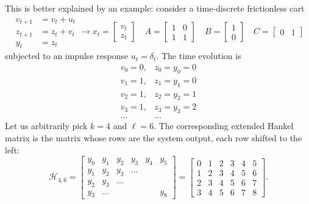 This is better explained by an example: consider a time-discrete frictionless cart
\begin{equation*}
  \begin{aligned}
    v_{t+1} &= v_t + u_t \\
    z_{t+1} &= z_t + v_t \\
    y_t &= z_t
  \end{aligned} \longrightarrow
  x_t =
  \begin{bmatrix}
    v_t \\ z_t
  \end{bmatrix}\quad A =
    \begin{bmatrix}
      1 & 0 \\ 1 & 1
    \end{bmatrix}\quad B =
    \begin{bmatrix}
      1 \\ 0
    \end{bmatrix}\quad C =
    \begin{bmatrix}
      0 & 1
    \end{bmatrix}
\end{equation*}
subjected to an impulse response $u_t=\delta_t$. The time evolution is
\begin{equation*}
  \begin{matrix}
    v_0 = 0, & z_0 = y_0 = 0 \\
    v_1 = 1, & z_1 = y_1 = 0 \\
    v_2 = 1, & z_2 = y_2 = 1 \\
    v_3 = 1, & z_3 = y_3 = 2 \\
    \ldots & \ldots
  \end{matrix}
\end{equation*}
Let us arbitrarily pick $k=4$ and $\ell=6$. The corresponding extended Hankel matrix is the matrix whose rows are the system output, each row shifted to the left:
\begin{equation*}
  \mathcal{H}_{4,6} =
  \begin{bmatrix}
    y_0 & y_1 & y_2 & y_3 & y_4 & y_5 \\
    y_1 & y_2 & y_3 & \ldots & & \\
    y_2 & y_3 & \ldots & & & \\
    y_3 & \ldots & & & & y_8
  \end{bmatrix} =
  \begin{bmatrix}
    0 & 1 & 2 & 3 & 4 & 5 \\
    1 & 2 & 3 & 4 & 5 & 6 \\
    2 & 3 & 4 & 5 & 6 & 7 \\
    3 & 4 & 5 & 6 & 7 & 8
  \end{bmatrix}.
\end{equation*}
